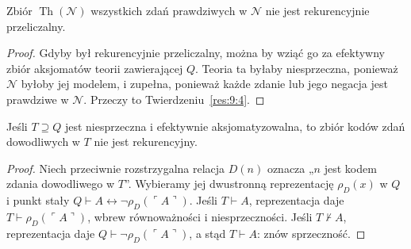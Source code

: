 \begin{wniosek}\label{res:9:5}
Zbiór $\operatorname{Th}(\mathcal N)$ wszystkich zdań prawdziwych w $\mathcal N$ nie jest rekurencyjnie przeliczalny.
\end{wniosek}
\begin{proof}
Gdyby był rekurencyjnie przeliczalny, można by wziąć go za efektywny zbiór aksjomatów teorii zawierającej $Q$. Teoria ta byłaby niesprzeczna, ponieważ $\mathcal N$ byłoby jej modelem, i zupełna, ponieważ każde zdanie lub jego negacja jest prawdziwe w $\mathcal N$. Przeczy to Twierdzeniu~\ref{res:9:4}.
\end{proof}

\begin{wniosek}\label{res:9:6}
Jeśli $T\supseteq Q$ jest niesprzeczna i efektywnie aksjomatyzowalna, to zbiór kodów zdań dowodliwych w $T$ nie jest rekurencyjny.
\end{wniosek}
\begin{proof}
Niech przeciwnie rozstrzygalna relacja $D(n)$ oznacza „$n$ jest kodem zdania dowodliwego w $T$”. Wybieramy jej dwustronną reprezentację $\rho_D(x)$ w $Q$ i punkt stały $Q\vdash A\leftrightarrow\neg\rho_D(\ulcorner A\urcorner)$. Jeśli $T\vdash A$, reprezentacja daje $T\vdash\rho_D(\ulcorner A\urcorner)$, wbrew równoważności i niesprzeczności. Jeśli $T\nvdash A$, reprezentacja daje $Q\vdash\neg\rho_D(\ulcorner A\urcorner)$, a stąd $T\vdash A$: znów sprzeczność.
\end{proof}

